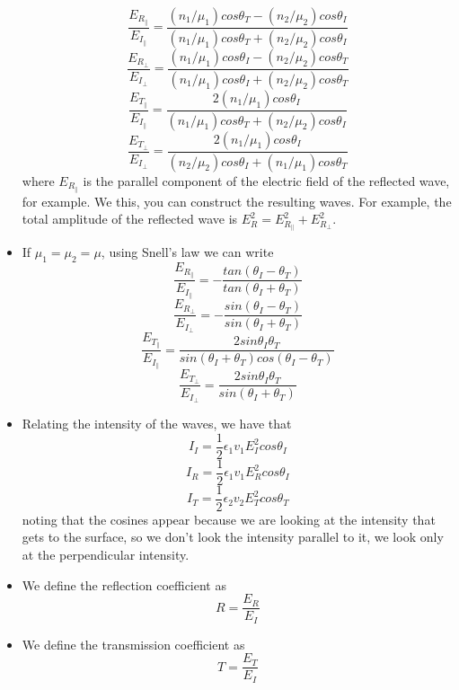 \documentclass[oneside, 10pt, notitlepage]{book}
\begin{document}
\begin{itemize}
    $$\frac{E_{R_{\parallel}}}{E_{I_{\parallel}}} = \frac{(n_1/\mu_1)cos\theta_T - (n_2/\mu_2)cos\theta_I}{(n_1/\mu_1)cos\theta_T + (n_2/\mu_2)cos\theta_I}$$
    $$\frac{E_{R_{\perp}}}{E_{I_{\perp}}} = \frac{(n_1/\mu_1)cos\theta_I - (n_2/\mu_2)cos\theta_T}{(n_1/\mu_1)cos\theta_I + (n_2/\mu_2)cos\theta_T}$$
    $$\frac{E_{T_{\parallel}}}{E_{I_{\parallel}}}  = \frac{2(n_1/\mu_1)cos\theta_I}{(n_1/\mu_1)cos\theta_T + (n_2/\mu_2)cos\theta_I}$$
    $$\frac{E_{T_{\perp}}}{E_{I_{\perp}}} = \frac{2(n_1/\mu_1)cos\theta_I}{(n_2/\mu_2)cos\theta_I + (n_1/\mu_1)cos\theta_T}$$
    where $E_{R_{\parallel}}$ is the parallel component of the electric field of the reflected wave, for example. We this, you can construct the resulting waves. For example, the total amplitude of the reflected wave is $E_R^2 = E_{R_{\parallel}}^2 + E_{R_{\perp}}^2$.
    \item If $\mu_1 = \mu_2 = \mu$, using Snell's law we can write
    $$\frac{E_{R_{\parallel}}}{E_{I_{\parallel}}} = -\frac{tan(\theta_I - \theta_T)}{tan(\theta_I + \theta_T)}$$
    $$\frac{E_{R_{\perp}}}{E_{I_{\perp}}} = -\frac{sin(\theta_I - \theta_T)}{sin(\theta_I + \theta_T)}$$
    $$\frac{E_{T_{\parallel}}}{E_{I_{\parallel}}} = \frac{2sin\theta_I\theta_T}{sin(\theta_I + \theta_T)cos(\theta_I - \theta_T)}$$
    $$\frac{E_{T_{\perp}}}{E_{I_{\perp}}} = \frac{2sin\theta_I\theta_T}{sin(\theta_I + \theta_T)}$$
    \item Relating the intensity of the waves, we have that
    $$I_I = \frac{1}{2}\epsilon_1 v_1 E_I^2 cos\theta_I$$
    $$I_R = \frac{1}{2}\epsilon_1 v_1 E_R^2 cos\theta_I$$
    $$I_T = \frac{1}{2}\epsilon_2 v_2 E_T^2 cos\theta_T$$
    noting that the cosines appear because we are looking at the intensity that gets to the surface, so we don't look the intensity parallel to it, we look only at the perpendicular intensity.
    \item We define the reflection coefficient as
    $$R = \frac{E_R}{E_I}$$
    \item We define the transmission coefficient as
    $$T = \frac{E_T}{E_I}$$
\end{itemize}
\end{document}
